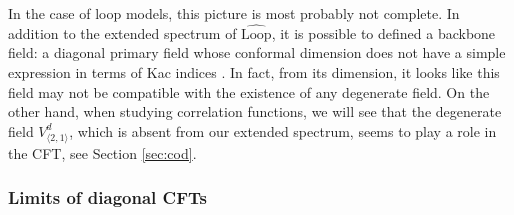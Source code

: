 \documentclass[12pt, a4paper]{article}
\theoremstyle{break}
\begin{document}
In the case of loop models, this picture is most probably not complete. In addition to the extended spectrum of $\widehat{\text{Loop}}$, it is possible to defined a backbone field: a diagonal primary field whose conformal dimension does not have a simple expression in terms of Kac indices \cite{nqsz23}. In fact, from its dimension, it looks like this field may not be compatible with the existence of any degenerate field. On the other hand, when studying correlation functions, we will see that the degenerate field $V^d_{\langle 2,1\rangle}$, which is absent from our extended spectrum, seems to play a role in the CFT, see Section \ref{sec:cod}. 

\subsubsection{Limits of diagonal CFTs}\label{sec:lod}
\end{document}
